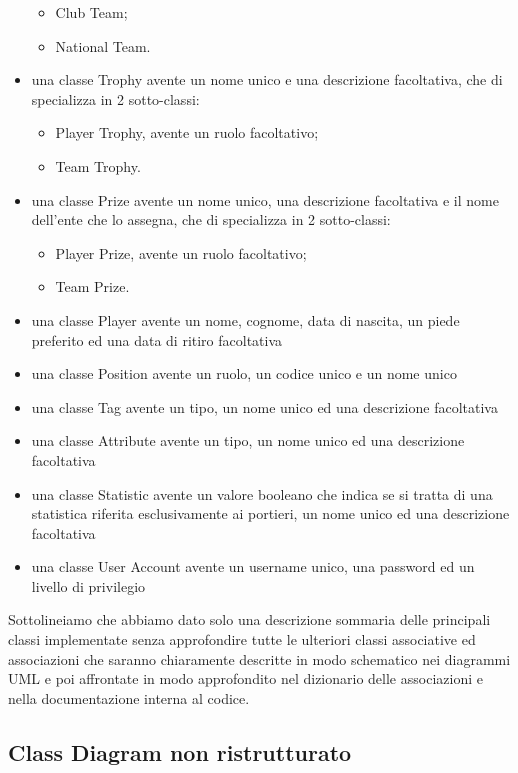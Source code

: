 \begin{itemize}
\begin{itemize}
			\item Club Team;
			\item National Team.
		\end{itemize}	
	\item una classe Trophy avente un nome unico e una descrizione facoltativa,
		che di specializza in 2 sotto-classi:
		\begin{itemize}
			\item Player Trophy, avente un ruolo facoltativo;
			\item Team Trophy.
		\end{itemize}
	\item una classe Prize avente un nome unico, una descrizione facoltativa e il nome
		dell'ente che lo assegna, che di specializza in 2 sotto-classi:	
		\begin{itemize}
			\item Player Prize, avente un ruolo facoltativo;
			\item Team Prize.
		\end{itemize}	
	\item una classe Player avente un nome, cognome, data di nascita, un piede preferito
		ed una data di ritiro facoltativa
	\item una classe Position avente un ruolo, un codice unico e un nome unico	
	\item una classe Tag avente un tipo, un nome unico ed una descrizione facoltativa	
	\item una classe Attribute avente un tipo, un nome unico ed una descrizione facoltativa	
	\item una classe Statistic avente un valore booleano che indica se si tratta di una
		statistica riferita esclusivamente ai portieri, un nome unico ed una descrizione
		facoltativa		
	\item una classe User Account avente un username unico, una password ed un livello di
		privilegio
\end{itemize}

Sottolineiamo che abbiamo dato solo una descrizione sommaria delle principali classi
implementate senza approfondire tutte le ulteriori classi associative ed associazioni
che saranno chiaramente descritte in modo schematico nei diagrammi UML e poi affrontate
in modo approfondito nel dizionario delle associazioni e nella documentazione interna al codice.
\newpage
\subsection{Class Diagram non ristrutturato}

